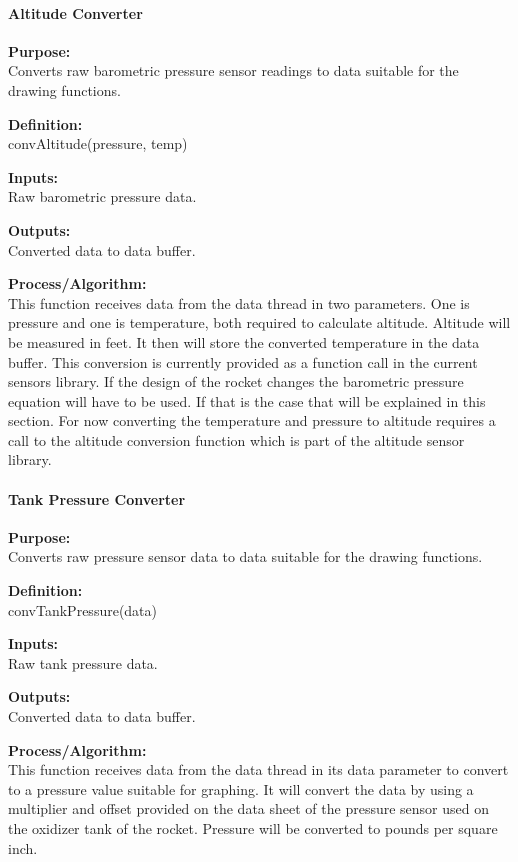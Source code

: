 \documentclass[10pt,draftclsnofoot,onecolumn,retainorgcmds]{IEEEtran}
\begin{document}
\paragraph{Altitude Converter}
{\bf Purpose:} \\
Converts raw barometric pressure sensor readings to data suitable for the drawing functions.  \par
{\bf Definition:} \\ 
convAltitude(pressure, temp) \par
{\bf Inputs:} \\ Raw barometric pressure data. \par
{\bf Outputs:} \\ Converted data to data buffer. \par
{\bf Process/Algorithm:} \\
This function receives data from the data thread in two parameters. One is pressure and one is temperature, both required to calculate altitude. Altitude will be measured in feet.  It then will store the converted temperature in the data buffer. This conversion is currently provided as a function call in the current sensors library. If the design of the rocket changes the barometric pressure equation will have to be used. If that is the case that will be explained in this section. For now converting the temperature and pressure to altitude requires a call to the altitude conversion function which is part of the altitude sensor library. \par

\paragraph{Tank Pressure Converter}
{\bf Purpose:} \\
Converts raw pressure sensor data to data suitable for the drawing functions.  \par
{\bf Definition:} \\ 
convTankPressure(data) \par
{\bf Inputs:} \\ Raw tank pressure data. \par
{\bf Outputs:} \\ Converted data to data buffer. \par
{\bf Process/Algorithm:} \\
This function receives data from the data thread in its data parameter to convert to a pressure value suitable for graphing. It will convert the data by using a multiplier and offset provided on the data sheet of the pressure sensor used on the oxidizer tank of the rocket. Pressure will be converted to pounds per square inch. \par
\end{document}
